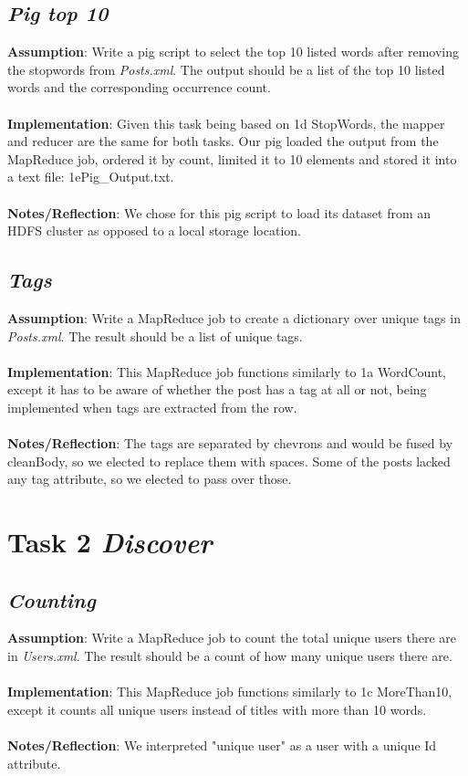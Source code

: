 \documentclass[fleqn,10pt]{wlscirep}
\begin{document}
\subsection{\emph{Pig top 10}}
\textbf{Assumption}: Write a pig script to select the top 10 listed words after removing the stopwords from \textit{Posts.xml}. The output should be a list of the top 10 listed words and the corresponding occurrence count.\\ \\
\textbf{Implementation}: Given this task being based on 1d StopWords, the mapper and reducer are the same for both tasks. Our pig loaded the output from the MapReduce job, ordered it by count, limited it to 10 elements and stored it into a text file: 1ePig\_Output.txt. \\ \\
\textbf{Notes/Reflection}: We chose for this pig script to load its dataset from an HDFS cluster as opposed to a local storage location.


\subsection{\emph{Tags}}
\textbf{Assumption}: Write a MapReduce job to create a dictionary over unique tags in \textit{Posts.xml}. The result should be a list of unique tags.\\ \\
\textbf{Implementation}: This MapReduce job functions similarly to 1a WordCount, except it has to be aware of whether the post has a tag at all or not, being implemented when tags are extracted from the row. \\ \\
\textbf{Notes/Reflection}: The tags are separated by chevrons and would be fused by cleanBody, so we elected to replace them with spaces. Some of the posts lacked any tag attribute, so we elected to pass over those.



\section{Task 2 \emph{Discover}}

\subsection{\emph{Counting}}
\textbf{Assumption}: Write a MapReduce job to count the total unique users there are in \textit{Users.xml}. The result should be a count of how many unique users there are.\\ \\
\textbf{Implementation}: This MapReduce job functions similarly to 1c MoreThan10, except it counts all unique users instead of titles with more than 10 words. \\ \\
\textbf{Notes/Reflection}: We interpreted "unique user" as a user with a unique Id attribute.

\end{document}
